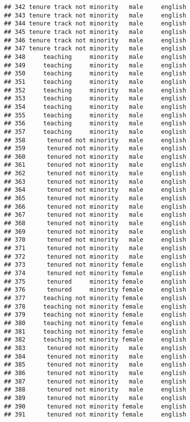 \documentclass[
]{article}
\begin{document}
\begin{verbatim}
## 342 tenure track not minority   male     english
## 343 tenure track not minority   male     english
## 344 tenure track not minority   male     english
## 345 tenure track not minority   male     english
## 346 tenure track not minority   male     english
## 347 tenure track not minority   male     english
## 348     teaching     minority   male     english
## 349     teaching     minority   male     english
## 350     teaching     minority   male     english
## 351     teaching     minority   male     english
## 352     teaching     minority   male     english
## 353     teaching     minority   male     english
## 354     teaching     minority   male     english
## 355     teaching     minority   male     english
## 356     teaching     minority   male     english
## 357     teaching     minority   male     english
## 358      tenured not minority   male     english
## 359      tenured not minority   male     english
## 360      tenured not minority   male     english
## 361      tenured not minority   male     english
## 362      tenured not minority   male     english
## 363      tenured not minority   male     english
## 364      tenured not minority   male     english
## 365      tenured not minority   male     english
## 366      tenured not minority   male     english
## 367      tenured not minority   male     english
## 368      tenured not minority   male     english
## 369      tenured not minority   male     english
## 370      tenured not minority   male     english
## 371      tenured not minority   male     english
## 372      tenured not minority   male     english
## 373      tenured not minority female     english
## 374      tenured not minority female     english
## 375      tenured     minority female     english
## 376      tenured     minority female     english
## 377     teaching not minority female     english
## 378     teaching not minority female     english
## 379     teaching not minority female     english
## 380     teaching not minority female     english
## 381     teaching not minority female     english
## 382     teaching not minority female     english
## 383      tenured not minority   male     english
## 384      tenured not minority   male     english
## 385      tenured not minority   male     english
## 386      tenured not minority   male     english
## 387      tenured not minority   male     english
## 388      tenured not minority   male     english
## 389      tenured not minority   male     english
## 390      tenured not minority female     english
## 391      tenured not minority female     english

\end{verbatim}
\end{document}
